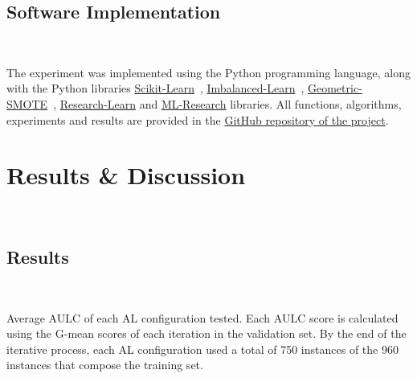 \documentclass[parskip=full]{scrartcl}
\begin{document}
\subsection{Software Implementation}~\label{sec:software_implementation}

The experiment was implemented using the Python programming language, along
with the Python libraries
\href{https://scikit-learn.org/stable/}{Scikit-Learn}~\cite{Pedregosa2011},
\href{https://imbalanced-learn.org/en/stable/}{Imbalanced-Learn}~\cite{JMLR:v18:16-365},
\href{https://geometric-smote.readthedocs.io/en/latest/?badge=latest}{Geometric-SMOTE}~\cite{Douzas2019},
\href{https://research-learn.readthedocs.io/en/latest/?badge=latest}{Research-Learn}
and
\href{https://mlresearch.readthedocs.io/en/latest/?badge=latest}{ML-Research}
libraries. All functions, algorithms, experiments and results are provided in
the \href{https://github.com/joaopfonseca/ml-research/}{GitHub repository of
the project}.

\section{Results \& Discussion}~\label{sec:results_discussion}

\subsection{Results}~\label{sec:sub_results}



\begin{table}[H]
    \centering
    \caption{%
        Mean rankings of the AULC metric over the different datasets (7),
        folds (5) and runs (3) used in the experiment. This means that the use
        of G-SMOTE almost always improves the results of the original
        framework.
    }\label{tab:aulc_ranks}
\end{table}


\begin{table}[htb]
    \centering
    \caption{\label{tab:aulc_scores}
        Average AULC of each AL configuration tested. Each AULC score is
        calculated using the G-mean scores of each iteration in the validation
        set. By the end of the iterative process, each AL configuration used a
        total of 750 instances of the 960 instances that compose the training
        set.
    }
\end{table}
\end{document}
